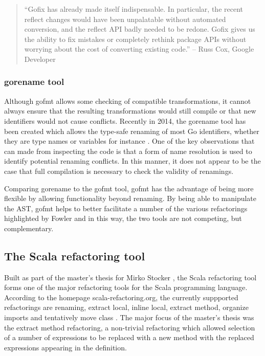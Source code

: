 \begin{quote}
``Gofix has already made itself indispensable. In particular, the recent reflect changes would have been unpalatable without automated conversion, and the reflect API badly needed to be redone. Gofix gives us the ability to fix mistakes or completely rethink package APIs without worrying about the cost of converting existing code.'' -- Russ Cox, Google Developer \cite{gofix11}
\end{quote}



\subsubsection{gorename tool}
Although gofmt allows some checking of compatible transformations, it cannot always ensure that the resulting transformations would still compile or that new identifiers would not cause conflicts. Recently in 2014, the gorename tool has been created which allows the type-safe renaming of most Go identifiers, whether they are type names or variables for instance \cite{gorename15}. One of the key observations that can made from inspecting the code is that a form of name resolution is used to identify potential renaming conflicts. In this manner, it does not appear to be the case that full compilation is necessary to check the validity of renamings.

Comparing gorename to the gofmt tool, gofmt has the advantage of being more flexible by allowing functionality beyond renaming. By being able to manipulate the AST, gofmt helps to better facilitate a number of the various refactorings highlighted by Fowler and in this way, the two tools are not competing, but complementary.

\subsection{The Scala refactoring tool}
Built as part of the master's thesis for Mirko Stocker \cite{stocker2010scala}, the Scala refactoring tool forms one of the major refactoring tools for the Scala programming language. According to the homepage scala-refactoring.org, the currently suppported refactorings are renaming, extract local, inline local, extract method, organize imports and tentatively move class \cite{scala15}. The major focus of the master's thesis was the extract method refactoring, a non-trivial refactoring which allowed selection of a number of expressions to be replaced with a new method with the replaced expressions appearing in the definition.

